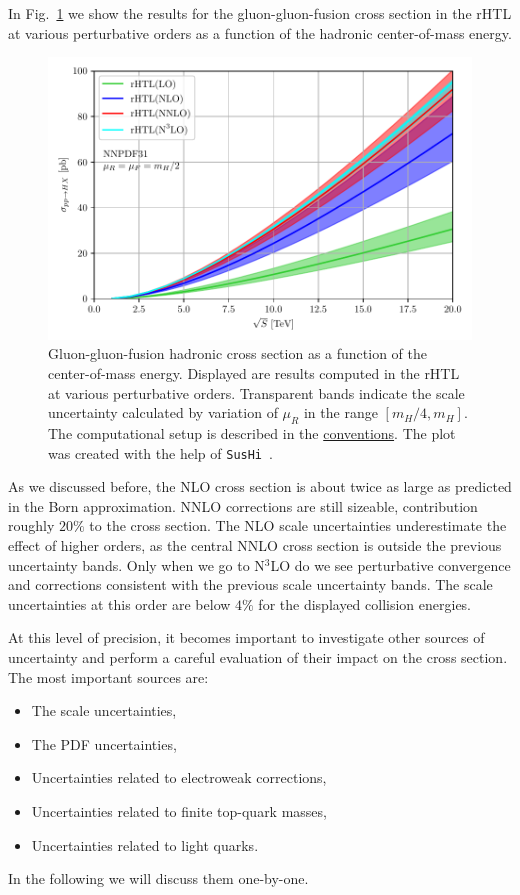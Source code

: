 In Fig.~\ref{fig:4:energy_scan_rHTL} we show the results for the gluon-gluon-fusion cross section in the \acs{rHTL} at various perturbative orders as a function of the hadronic center-of-mass energy.
\begin{figure}[ht]
\centering
\includegraphics[width=\figurewidth]{Images/energy_scan_HTL.pdf}
\caption{Gluon-gluon-fusion hadronic cross section as a function of the center-of-mass energy. Displayed are results computed in the \acs{rHTL} at various perturbative orders. Transparent bands indicate the scale uncertainty calculated by variation of $\mu_R$ in the range $[m_H/4, m_H]$. The computational setup is described in the \hyperref[chap:notation_and_conventions]{conventions}. The plot was created with the help of \texttt{SusHi}~\cite{Harlander:2012pb, Harlander:2016hcx}.}
\label{fig:4:energy_scan_rHTL}
\end{figure}

As we discussed before, the \acs{NLO} cross section is about twice as large as predicted in the Born approximation. \acs{NNLO} corrections are still sizeable, contribution roughly $20\%$ to the cross section. The \acs{NLO} scale uncertainties underestimate the effect of higher orders, as the central \acs{NNLO} cross section is outside the previous uncertainty bands. Only when we go to N${}^3$LO do we see perturbative convergence and corrections consistent with the previous scale uncertainty bands. The scale uncertainties at this order are below $4\%$ for the displayed collision energies.

At this level of precision, it becomes important to investigate other sources of uncertainty and perform a careful evaluation of their impact on the cross section. The most important sources are:
\begin{itemize}
  \item The scale uncertainties,
  \item The \acs{PDF} uncertainties,
  \item Uncertainties related to electroweak corrections,
  \item Uncertainties related to finite top-quark masses,
  \item Uncertainties related to light quarks.
\end{itemize}
In the following we will discuss them one-by-one.

